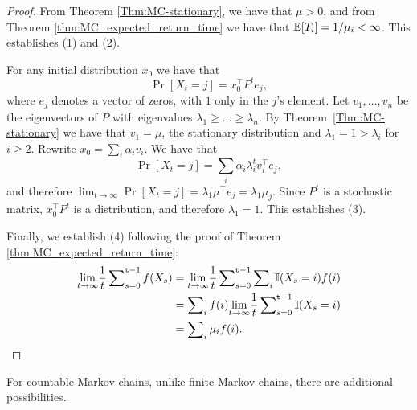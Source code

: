 %
%
%
%

\begin{proof}
From Theorem \ref{Thm:MC-stationary}, we have that $\mu >0$, and from Theorem \ref{thm:MC_expected_return_time} we have that $\mathbb{E}[T_i] = 1/\mu_i < \infty$. This establishes (1) and (2).

For any initial distribution $x_0$ we have that
\[
\Pr
[X_t=j]= x_0^\top P^t e_j,
\]
where $e_j$ denotes a vector of zeros, with $1$ only in the $j$'s element. Let $v_1, \ldots , v_n$ be the eigenvectors of $P$ with eigenvalues
$\lambda_1 \geq  \ldots \geq  \lambda_n$. By
Theorem~\ref{Thm:MC-stationary} we have that $v_1=\mu$, the stationary
distribution and $\lambda_1=1>\lambda_i$ for $i\geq 2$. Rewrite
$x_0=\sum_i \alpha_i v_i$. We have that
\[
\Pr
[X_t=j]= \sum_i \alpha_i \lambda_i^t v_i^\top e_j,
\]
and therefore ${\lim _{t \to \infty }}\Pr
[X_t=j] = \lambda_1 \mu^\top e_j 
 = \lambda_1 {\mu_j}$.
Since $P^t$ is a stochastic matrix,
$x_0^\top P^t$ is a distribution, and therefore $\lambda_1 = 1$. This establishes (3). 

Finally, we establish (4) following the proof of Theorem \ref{thm:MC_expected_return_time}:
\begin{equation}
    \begin{split}
{\lim _{t \to \infty }}\frac{1}{t}\sum\nolimits_{s = 0}^{{\tt t} - 1} f({X_s}) &= {\lim _{t \to \infty }}\frac{1}{t}\sum\nolimits_{s = 0}^{{\tt t} - 1} \sum\nolimits_{i}\mathbb{I} (X_s=i)f({i})\\
&=\sum\nolimits_{i}f({i}){\lim _{t \to \infty }}\frac{1}{t}\sum\nolimits_{s = 0}^{{\tt t} - 1} \mathbb{I} (X_s=i)\\
&= \sum\nolimits_i {\mu_i f(i)}.
    \end{split}
\end{equation}
\end{proof}

For countable Markov chains, unlike finite Markov chains, there are additional possibilities.

